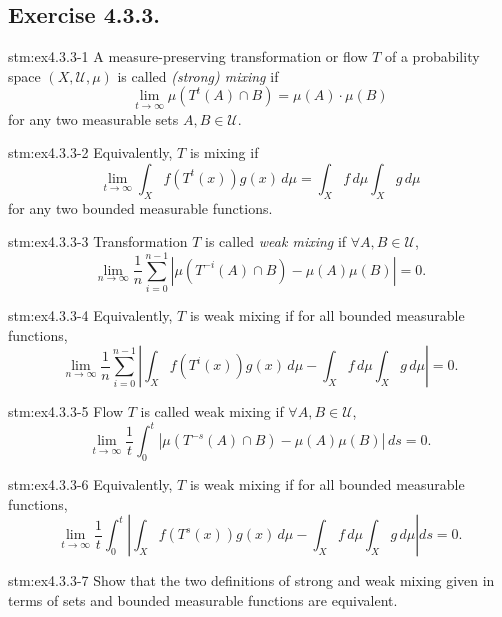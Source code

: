\subsection*{Exercise 4.3.3.}

\begin{exercise}{stm:ex4.3.3-1}
A measure-preserving transformation or flow $T$ of a probability space $(X, \mathcal{U}, \mu)$ is called \textit{(strong) mixing} if
\[
\lim_{t \to \infty} \mu(T^t(A) \cap B) = \mu(A) \cdot \mu(B)
\]
for any two measurable sets $A, B \in \mathcal{U}$.
\end{exercise}

\begin{exercise}{stm:ex4.3.3-2}
Equivalently, $T$ is mixing if
\[
\lim_{t \to \infty} \int_X f(T^t(x)) g(x) \, d\mu = \int_X f \, d\mu \int_X g \, d\mu
\]
for any two bounded measurable functions.
\end{exercise}

\begin{exercise}{stm:ex4.3.3-3}
Transformation $T$ is called \textit{weak mixing} if $\forall A, B \in \mathcal{U}$,
\[
\lim_{n \to \infty} \frac{1}{n} \sum_{i=0}^{n-1} \left| \mu(T^{-i}(A) \cap B) - \mu(A)\mu(B) \right| = 0.
\]
\end{exercise}

\begin{exercise}{stm:ex4.3.3-4}
Equivalently, $T$ is weak mixing if for all bounded measurable functions,
\[
\lim_{n \to \infty} \frac{1}{n} \sum_{i=0}^{n-1} \left| \int_X f(T^i(x)) g(x) \, d\mu - \int_X f \, d\mu \int_X g \, d\mu \right| = 0.
\]
\end{exercise}

\begin{exercise}{stm:ex4.3.3-5}
Flow $T$ is called weak mixing if $\forall A, B \in \mathcal{U}$,
\[
\lim_{t \to \infty} \frac{1}{t} \int_0^t \left| \mu(T^{-s}(A) \cap B) - \mu(A)\mu(B) \right| \, ds = 0.
\]
\end{exercise}

\begin{exercise}{stm:ex4.3.3-6}
Equivalently, $T$ is weak mixing if for all bounded measurable functions,
\[
\lim_{t \to \infty} \frac{1}{t} \int_0^t \left| \int_X f(T^s(x))g(x) \, d\mu - \int_X f \, d\mu \int_X g \, d\mu \right| ds = 0.
\]
\end{exercise}

\begin{exercise}{stm:ex4.3.3-7}
Show that the two definitions of strong and weak mixing given in terms of sets and bounded measurable functions are equivalent.
\end{exercise}

